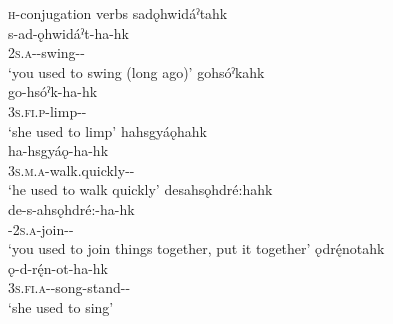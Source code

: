 \ea\label{ex:habitvarex3} \textsc{h}-conjugation verbs
\ea sadǫhwidáˀtahk\\
\gll s-ad-ǫhwidáˀt-ha-hk\\
 \textsc{2s.a}-{\semireflexive}-swing-{\habitual}-{\former}\\
\glt `you used to swing (long ago)'
\ex gohsóˀkahk\\
\gll go-hsóˀk-ha-hk\\
 \textsc{3s.fi.p}-limp-{\habitual}-{\former}\\
\glt `she used to limp'
\ex hahsgyáǫhahk\\
\gll ha-hsgyáǫ-ha-hk\\
 \textsc{3s.m.a}-walk.quickly-{\habitual}-{\former}\\
\glt `he used to walk quickly'
\newpage 
{}
\ex desahsǫhdré:hahk\\
\gll de-s-ahsǫhdré:-ha-hk\\
 {\dualic}-\textsc{2s.a}-join-{\habitual}-{\former}\\
\glt `you used to join things together, put it together'
\ex ǫdrę́notahk\\
\gll ǫ-d-rę́n-ot-ha-hk\\
 \textsc{3s.fi.a}-{\semireflexive}-song-stand-{\habitual}-{\former}\\
\glt `she used to sing'
\z
\z


